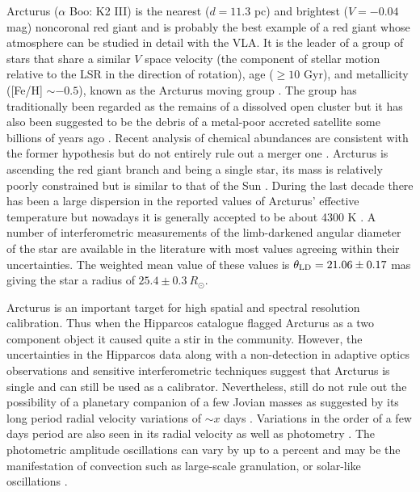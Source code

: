 Arcturus ($\alpha$ Boo: K2 III) is the nearest ($d=11.3$ pc) and brightest ($V=-0.04$ mag) noncoronal red giant and is probably the best example of a red giant whose atmosphere can be studied in detail with the VLA. It is the leader of a group of stars that share a similar $V$  space velocity (the component of stellar motion relative to the LSR in the direction of rotation),  age ($\geq10$ Gyr), and metallicity ([Fe/H] $\sim -0.5$), known as the Arcturus moving group \citep{eggen_1971}. The group has traditionally been regarded as the remains of a dissolved open cluster \citep[e.g.,][]{eggen_1971,eggen_1996} but it has also been suggested to be  the debris of a metal-poor accreted satellite some billions of years ago \citep{navarro_2004}. Recent analysis of chemical abundances are consistent with the former hypothesis but do not entirely rule out a merger one \citep{williams_2009}. Arcturus is ascending the red giant branch and being a single star, its mass is relatively poorly constrained but is similar to that of the Sun \citep[$0.8 \pm 0.2 \ M_{\odot}$ by][]{kallinger_2010}. During the last decade there has been a large dispersion in the reported values of Arcturus' effective temperature \citep[a nice graph summarizing this is presented in][]{griffin_1996} but nowadays it is generally accepted to be about 4300 K \citep{di_benedetto_1993}. A number of interferometric measurements of the limb-darkened angular diameter of the star are available in the literature with most values agreeing within their uncertainties. The weighted mean value of these values is $\theta _{\rm{LD}}= 21.06\pm0.17$ mas \citep{ramirez_2011} giving the star a radius of $25.4\pm 0.3\ R_{\odot}$.

Arcturus is an important target for high spatial and spectral resolution calibration. Thus when the Hipparcos catalogue flagged Arcturus as a two component object \citep{perryman_1997} it caused quite a stir in the community. However, the uncertainties in the  Hipparcos data \citep{Soderhjelm_1998O} along with a non-detection in adaptive optics observations \citep{turner_1999} and sensitive interferometric techniques \citep{lacour_2008} suggest that Arcturus is single and can still be used as a calibrator. Nevertheless, \cite{lacour_2008} still do not rule out the possibility of a planetary companion of a few Jovian masses as suggested by its long period radial velocity variations of $\sim x$ days \citep{hatzes_1993,brown_2007}. Variations in the order of a few days period are also seen in its radial velocity \citep{merline_1999} as well as photometry \citep{retter_2003}. The photometric amplitude oscillations can vary by up to a percent and may be the manifestation of convection such as large-scale granulation, or solar-like oscillations \citep{dziembowski_2001}. 

